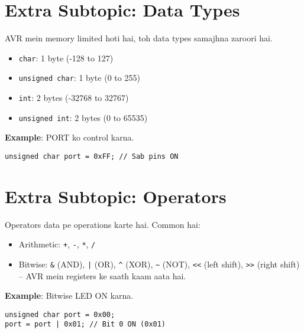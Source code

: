 \documentclass[a4paper,12pt]{article}
\begin{document}
\section*{\textbf{\LARGE \textcolor{headingblue}{Extra Subtopic: Data Types}}}
AVR mein memory limited hoti hai, toh data types samajhna zaroori hai. \\
\begin{itemize}
    \item \texttt{char}: 1 byte (-128 to 127)
    \item \texttt{unsigned char}: 1 byte (0 to 255)
    \item \texttt{int}: 2 bytes (-32768 to 32767)
    \item \texttt{unsigned int}: 2 bytes (0 to 65535)
\end{itemize}

\begin{examplebox}
\textbf{Example}: PORT ko control karna. \\
\begin{lstlisting}
unsigned char port = 0xFF; // Sab pins ON
\end{lstlisting}
\end{examplebox}

\section*{\textbf{\LARGE \textcolor{headingblue}{Extra Subtopic: Operators}}}
Operators data pe operations karte hai. Common hai: \\
\begin{itemize}
    \item Arithmetic: \texttt{+}, \texttt{-}, \texttt{*}, \texttt{/}
    \item Bitwise: \texttt{\&} (AND), \texttt{|} (OR), \texttt{\^{}} (XOR), \texttt{\~{}} (NOT), \texttt{<<} (left shift), \texttt{>>} (right shift) – AVR mein registers ke saath kaam aata hai.
\end{itemize}

\begin{examplebox}
\textbf{Example}: Bitwise LED ON karna. \\
\begin{lstlisting}
unsigned char port = 0x00;
port = port | 0x01; // Bit 0 ON (0x01)
\end{lstlisting}
\end{examplebox}

\end{document}
